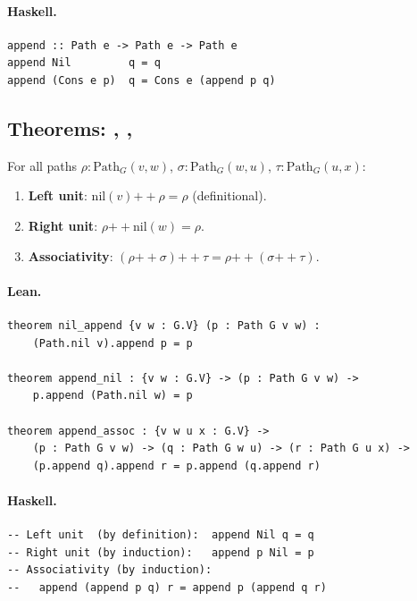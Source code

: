 \documentclass[11pt,a4paper]{article}
\begin{document}
\paragraph{Haskell.}
\begin{lstlisting}[style=haskell]
append :: Path e -> Path e -> Path e
append Nil         q = q
append (Cons e p)  q = Cons e (append p q)
\end{lstlisting}


\subsection{Theorems: , , }

\begin{thm}
For all paths $\rho : \mathrm{Path}_G(v, w)$,
$\sigma : \mathrm{Path}_G(w, u)$, $\tau : \mathrm{Path}_G(u, x)$:
\begin{enumerate}
  \item \textbf{Left unit}: $\mathrm{nil}(v) \mathbin{+\!\!+} \rho = \rho$ (definitional).
  \item \textbf{Right unit}: $\rho \mathbin{+\!\!+} \mathrm{nil}(w) = \rho$.
  \item \textbf{Associativity}: $(\rho \mathbin{+\!\!+} \sigma) \mathbin{+\!\!+} \tau = \rho \mathbin{+\!\!+} (\sigma \mathbin{+\!\!+} \tau)$.
\end{enumerate}
\end{thm}

\paragraph{Lean.}
\begin{lstlisting}[style=lean]
theorem nil_append {v w : G.V} (p : Path G v w) :
    (Path.nil v).append p = p

theorem append_nil : {v w : G.V} -> (p : Path G v w) ->
    p.append (Path.nil w) = p

theorem append_assoc : {v w u x : G.V} ->
    (p : Path G v w) -> (q : Path G w u) -> (r : Path G u x) ->
    (p.append q).append r = p.append (q.append r)
\end{lstlisting}

\paragraph{Haskell.}
\begin{lstlisting}[style=haskell]
-- Left unit  (by definition):  append Nil q = q
-- Right unit (by induction):   append p Nil = p
-- Associativity (by induction):
--   append (append p q) r = append p (append q r)
\end{lstlisting}
\end{document}
